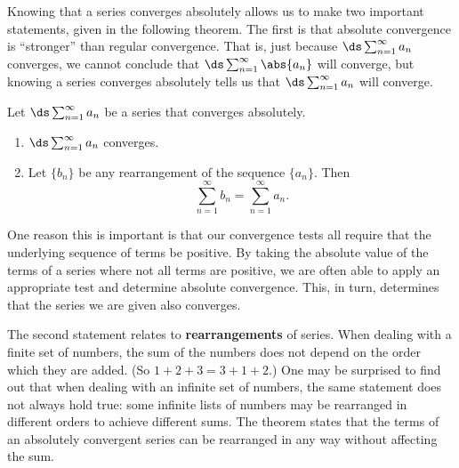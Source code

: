 Knowing that a series converges absolutely allows us to make two important statements, given in the following theorem. The first is that absolute convergence is  ``stronger'' than regular convergence.\vspace{-.5\baselineskip}
That is, just because {\small$\ds \sum_{n=1}^\infty a_n$} converges, we cannot conclude that {\small$\ds \sum_{n=1}^\infty \abs{a_n}$} will converge, but knowing a series converges absolutely tells us that {\small$\ds \sum_{n=1}^\infty a_n$} will converge. 

\begin{theorem}\label{thm:abs_convergence}
Let $\ds \sum_{n=1}^\infty a_n$ be a series that converges absolutely.
\begin{enumerate}
	\item $\ds \sum_{n=1}^\infty a_n$ converges.
	\item	Let $\{b_n\}$ be any rearrangement of the sequence $\{a_n\}$. Then 
	\[\sum_{n=1}^\infty b_n = \sum_{n=1}^\infty a_n.\]
\end{enumerate}
\end{theorem}

One reason this is important is that our convergence tests all require that the underlying sequence of terms be positive. By taking the absolute value of the terms of a series where not all terms are positive, we are often able to apply an appropriate test and determine absolute convergence. This, in turn, determines that the series we are given also converges.

The second statement relates to \textbf{rearrangements} of series. When dealing with a finite set of numbers, the sum of the numbers does not depend on the order which they are added. (So $1+2+3 = 3+1+2$.) One may be surprised to find out that when dealing with an infinite set of numbers, the same statement does not always hold true: some infinite lists of numbers may be rearranged in different orders to achieve different sums. The theorem states that the terms of an absolutely convergent series can be rearranged in any way without affecting the sum.


